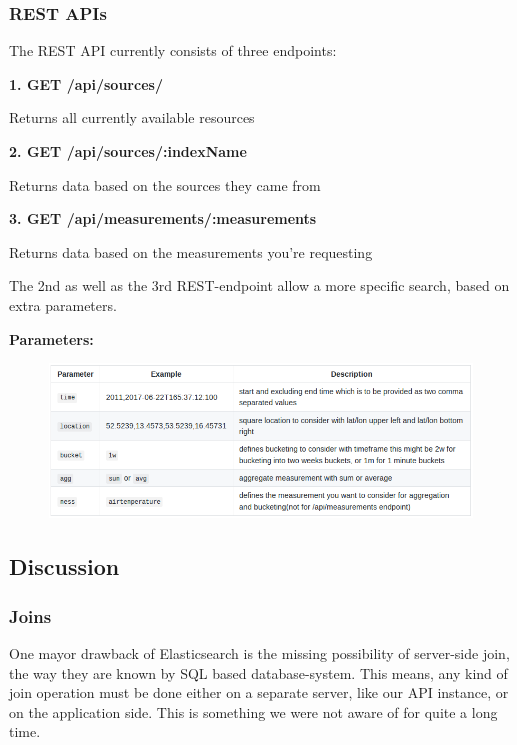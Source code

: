 \subsubsection{REST APIs}\label{rest-apis}

The REST API currently consists of three endpoints:

\textbf{1. GET /api/sources/}

Returns all currently available resources

\textbf{2. GET /api/sources/:indexName}

Returns data based on the sources they came from

\textbf{3. GET /api/measurements/:measurements}

Returns data based on the measurements you're requesting

The 2nd as well as the 3rd REST-endpoint allow a more specific search,
based on extra parameters.

\textbf{Parameters:}

\begin{figure}[htbp]
\centering
\includegraphics[width=1.00\textwidth]{images/07-table.png}
\end{figure}

\subsection{Discussion}\label{discussion}

\subsubsection{Joins}\label{joins}

One mayor drawback of Elasticsearch is the missing possibility of
server-side join, the way they are known by SQL based database-system.
This means, any kind of join operation must be done either on a separate
server, like our API instance, or on the application side. This is
something we were not aware of for quite a long time.

